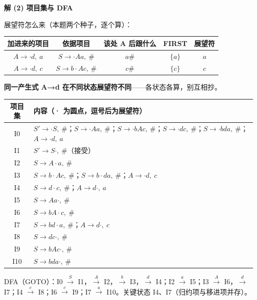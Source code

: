 \documentclass[12pt,a4paper,fontset=windows]{ctexart}
\begin{document}
\textbf{解 (2) 项目集与 DFA}

展望符怎么来（本题两个种子，逐个算）：

\begin{center}
\renewcommand{\arraystretch}{1.25}
\begin{tabular}{c c c c c}
\toprule
\textbf{加进来的项目} & \textbf{依据项目} & \textbf{该处 A 后跟什么} & \textbf{FIRST} & \textbf{展望符} \\
\midrule
$A \to \cdot d,\ a$ & $S \to \cdot Aa,\ \#$ & $a\#$ & $\{a\}$ & $a$ \\
$A \to \cdot d,\ c$ & $S \to b \cdot Ac,\ \#$ & $c\#$ & $\{c\}$ & $c$ \\
\bottomrule
\end{tabular}
\end{center}

\textbf{同一产生式 A→d 在不同状态展望符不同}——各状态各算，别互相抄。

\begin{center}
\renewcommand{\arraystretch}{1.25}
\begin{tabular}{c p{11.8cm}}
\toprule
\textbf{项目集} & \textbf{内容（· 为圆点，逗号后为展望符）} \\
\midrule
I0 & $S' \to \cdot S,\ \#$；$S \to \cdot Aa,\ \#$；$S \to \cdot bAc,\ \#$；$S \to \cdot dc,\ \#$；$S \to \cdot bda,\ \#$；$A \to \cdot d,\ a$ \\
I1 & $S' \to S\cdot,\ \#$（接受） \\
I2 & $S \to A\cdot a,\ \#$ \\
I3 & $S \to b\cdot Ac,\ \#$；$S \to b\cdot da,\ \#$；$A \to \cdot d,\ c$ \\
I4 & {\boldmath $S \to d\cdot c,\ \#$}；{\boldmath $A \to d\cdot,\ a$} \\
I5 & $S \to Aa\cdot,\ \#$ \\
I6 & $S \to bA\cdot c,\ \#$ \\
I7 & {\boldmath $S \to bd\cdot a,\ \#$}；{\boldmath $A \to d\cdot,\ c$} \\
I8 & $S \to dc\cdot,\ \#$ \\
I9 & $S \to bAc\cdot,\ \#$ \\
I10 & $S \to bda\cdot,\ \#$ \\
\bottomrule
\end{tabular}
\end{center}

DFA（GOTO）：I0 $\xrightarrow{S}$ I1，$\xrightarrow{A}$ I2，$\xrightarrow{b}$ I3，$\xrightarrow{d}$ I4；I2 $\xrightarrow{a}$ I5；I3 $\xrightarrow{A}$ I6，$\xrightarrow{d}$ I7；I4 $\xrightarrow{c}$ I8；I6 $\xrightarrow{c}$ I9；I7 $\xrightarrow{a}$ I10。关键状态 I4、I7（归约项与移进项并存）。
\end{document}
